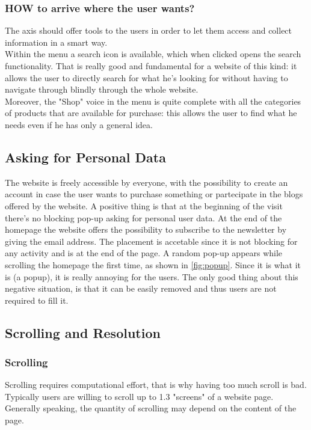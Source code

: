 \subsubsection{HOW to arrive where the user wants?} 
The axis should offer tools to the users in order to let them access and collect information in a smart way.\\

Within the menu a search icon is available, which when clicked opens the search functionality. That is really good and fundamental for a website of this kind: it allows the user 
to directly search for what he's looking for without having to navigate through blindly through the whole website.\\
Moreover, the "Shop" voice in the menu is quite complete with all the categories of products that are available for purchase: this allows the user to find what he needs even if he has 
only a general idea.


\subsection{Asking for Personal Data}
The website is freely accessible by everyone, with the possibility to create an account in case the user wants to purchase something 
or partecipate in the blogs offered by the website. 
A positive thing is that at the beginning of the visit there's no blocking pop-up asking for personal user data. 
At the end of the homepage the website offers the possibility to subscribe to the newsletter by giving the email address.
The placement is accetable since it is not blocking for any activity and is at the end of the page.
A random pop-up appears while scrolling the homepage the first time, as shown in \cref{fig:popup}. Since it is what it is (a popup), it is really annoying for the users. The only good thing about this negative situation, is that it can be easily removed and thus users are not required to fill it.


\subsection{Scrolling and Resolution}
\subsubsection{Scrolling}
Scrolling requires computational effort, that is why having too much scroll is bad. Typically users are willing to scroll up to 1.3 "screens" of a website page. Generally speaking, the quantity of scrolling may depend on the content of the page.\\

